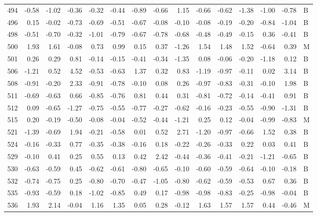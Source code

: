 \begin{table}[ht]
\begin{tabular}{rrrrrrrrrrrrrrl}
  494 & -0.58 & -1.02 & -0.36 & -0.32 & -0.44 & -0.89 & -0.66 & 1.15 & -0.66 & -0.62 & -1.38 & -1.00 & -0.78 & B \\ 
  496 & 0.15 & -0.02 & -0.73 & -0.69 & -0.51 & -0.67 & -0.08 & -0.10 & -0.08 & -0.19 & -0.20 & -0.84 & -1.04 & B \\ 
  498 & -0.51 & -0.70 & -0.32 & -1.01 & -0.79 & -0.67 & -0.78 & -0.68 & -0.48 & -0.49 & -0.15 & 0.36 & -0.41 & B \\ 
  500 & 1.93 & 1.61 & -0.08 & 0.73 & 0.99 & 0.15 & 0.37 & -1.26 & 1.54 & 1.48 & 1.52 & -0.64 & 0.39 & M \\ 
  501 & 0.26 & 0.29 & 0.81 & -0.14 & -0.15 & -0.41 & -0.34 & -1.35 & 0.08 & -0.06 & -0.20 & -1.18 & 0.12 & B \\ 
  506 & -1.21 & 0.52 & 4.52 & -0.53 & -0.63 & 1.37 & 0.32 & 0.83 & -1.19 & -0.97 & -0.11 & 0.02 & 3.14 & B \\ 
  508 & -0.91 & -0.20 & 2.33 & -0.91 & -0.78 & -0.10 & 0.08 & 0.26 & -0.97 & -0.83 & -0.31 & -0.10 & 1.98 & B \\ 
  511 & -0.69 & -0.63 & 0.66 & -0.85 & -0.76 & 0.81 & 0.44 & 0.31 & -0.81 & -0.72 & -0.14 & -0.41 & 0.91 & B \\ 
  512 & 0.09 & -0.65 & -1.27 & -0.75 & -0.55 & -0.77 & -0.27 & -0.62 & -0.16 & -0.23 & -0.55 & -0.90 & -1.31 & B \\ 
  515 & 0.20 & -0.19 & -0.50 & -0.08 & -0.04 & -0.52 & -0.44 & -1.21 & 0.25 & 0.12 & -0.04 & -0.99 & -0.83 & M \\ 
  521 & -1.39 & -0.69 & 1.94 & -0.21 & -0.58 & 0.01 & 0.52 & 2.71 & -1.20 & -0.97 & -0.66 & 1.52 & 0.38 & B \\ 
  524 & -0.16 & -0.33 & 0.77 & -0.35 & -0.38 & -0.16 & 0.18 & -0.22 & -0.26 & -0.33 & 0.22 & 0.03 & 0.41 & B \\ 
  529 & -0.10 & 0.41 & 0.25 & 0.55 & 0.13 & 0.42 & 2.42 & -0.44 & -0.36 & -0.41 & -0.21 & -1.21 & -0.65 & B \\ 
  530 & -0.63 & -0.59 & 0.45 & -0.62 & -0.61 & -0.80 & -0.65 & -0.10 & -0.60 & -0.59 & -0.64 & -0.10 & -0.18 & B \\ 
  532 & -0.74 & -0.75 & 0.25 & -0.80 & -0.70 & -0.47 & -1.05 & -0.80 & -0.62 & -0.59 & -0.53 & 0.67 & 0.36 & B \\ 
  535 & -0.93 & -0.59 & 0.18 & -1.02 & -0.85 & 0.49 & 0.17 & -0.98 & -0.98 & -0.83 & -0.25 & -0.98 & -0.04 & B \\ 
  536 & 1.93 & 2.14 & -0.04 & 1.16 & 1.35 & 0.05 & 0.28 & -0.12 & 1.63 & 1.57 & 1.57 & 0.44 & -0.46 & M \\ 

\end{tabular}
\end{table}
